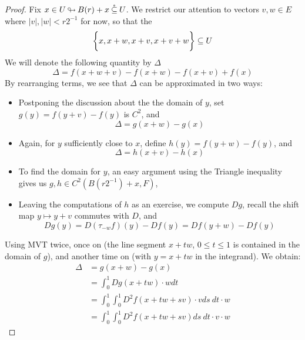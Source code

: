 \documentclass[../main-manifolds.tex]{subfiles}
\begin{document}
\begin{proof}
    Fix $x\in U{\:\looparrowright\:} B(r) + x\:\mathring{\subseteq}\: U$. We restrict our attention to vectors $v,w\in E$ where $\vert v\vert, \vert w\vert < r2^{-1}$ for now, so that the
    \[
    \biggl\{{x, x+w, x+v, x+v+w}\biggr\}\subseteq U
    \]
    We will denote the following quantity by $\Delta$
    \[
        \Delta = f(x+w+v) - f(x+w) - f(x+v) + f(x)
    \]
    By rearranging terms, we see that $\Delta$ can be approximated in two ways:
    \begin{itemize}
        \item Postponing the discussion about the the domain of $y$, set $g(y) = f(y+v) - f(y)$ is $C^2$, and 
        \begin{equation}\label{second-derivative-Delta-g}
            \Delta = g(x+w) - g(x)
        \end{equation}
        \item Again, for $y$ sufficiently close to $x$, define $h(y) = f(y+w) - f(y)$, and
        \begin{equation}\label{second-derivative-Delta-h}
            \Delta = h(x+v) - h(x)
        \end{equation}
        \item To find the domain for $y$, an easy argument using the Triangle inequality gives us $g,h \in C^2(B(r2^{-1}) + x, F)$,
        \item Leaving the computations of $h$ as an exercise, we compute $Dg$, recall the shift map $y\mapsto y+v$ commutes with $D$, and
        \begin{equation}\label{second-derivative-Delta-Dg}
            Dg(y) = D(\tau_{-w}f)(y)  - Df(y) = Df(y+w) - Df(y)
        \end{equation}
    \end{itemize}

    Using MVT twice, once on  (the line segment $x + tw$, $0\leq t\leq 1$ is contained in the domain of $g$), and another time on  (with $y = x+tw$ in the integrand). We obtain:
    \begin{align*}
        \Delta &= g(x+w) - g(x)\\
        &= \int_{0}^1 Dg(x+tw)\cdot w dt\\
        &= \int_0^1\int_0^1 D^2f(x + tw+sv)\cdot v ds\: dt \cdot w\\
        &= \int_0^1\int_0^1 D^2f(x + tw + sv) ds\: dt \cdot v\cdot w
    \end{align*}


\end{proof}
\end{document}
